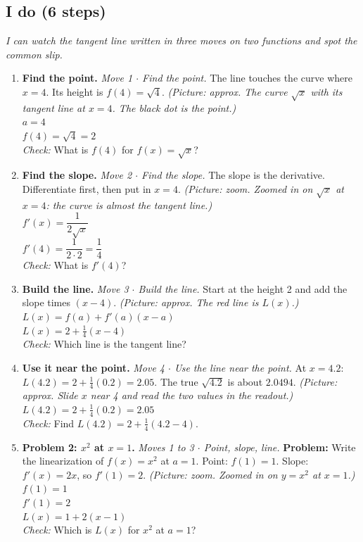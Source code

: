 \documentclass[11pt]{article}
\begin{document}
\subsection*{I do (6 steps)}
\textit{I can watch the tangent line written in three moves on two functions and spot the common slip.}\par
\begin{enumerate}
\item \textbf{Find the point.} \textit{Move 1 $\cdot$ Find the point.} The line touches the curve where $x=4$. Its height is $f(4)=\sqrt4$. \textit{(Picture: approx. The curve $\sqrt{x}$ with its tangent line at $x=4$. The black dot is the point.)}\\ $a=4$\\ $f(4)=\sqrt4=2$\\ \textit{Check:} What is $f(4)$ for $f(x)=\sqrt{x}$? 
\item \textbf{Find the slope.} \textit{Move 2 $\cdot$ Find the slope.} The slope is the derivative. Differentiate first, then put in $x=4$. \textit{(Picture: zoom. Zoomed in on $\sqrt{x}$ at $x=4$: the curve is almost the tangent line.)}\\ $f'(x)=\dfrac{1}{2\sqrt{x}}$\\ $f'(4)=\dfrac{1}{2\cdot2}=\dfrac14$\\ \textit{Check:} What is $f'(4)$? 
\item \textbf{Build the line.} \textit{Move 3 $\cdot$ Build the line.} Start at the height 2 and add the slope times $(x-4)$. \textit{(Picture: approx. The red line is $L(x)$.)}\\ $L(x)=f(a)+f'(a)(x-a)$\\ $L(x)=2+\tfrac14(x-4)$\\ \textit{Check:} Which line is the tangent line? 
\item \textbf{Use it near the point.} \textit{Move 4 $\cdot$ Use the line near the point.} At $x=4.2$: $L(4.2)=2+\tfrac14(0.2)=2.05$. The true $\sqrt{4.2}$ is about $2.0494$. \textit{(Picture: approx. Slide $x$ near 4 and read the two values in the readout.)}\\ $L(4.2)=2+\tfrac14(0.2)=2.05$\\ \textit{Check:} Find $L(4.2)=2+\tfrac14(4.2-4)$. 
\item \textbf{Problem 2: $x^2$ at $x=1$.} \textit{Moves 1 to 3 $\cdot$ Point, slope, line.} \textbf{Problem:} Write the linearization of $f(x)=x^2$ at $a=1$. Point: $f(1)=1$. Slope: $f'(x)=2x$, so $f'(1)=2$. \textit{(Picture: zoom. Zoomed in on $y=x^2$ at $x=1$.)}\\ $f(1)=1$\\ $f'(1)=2$\\ $L(x)=1+2(x-1)$\\ \textit{Check:} Which is $L(x)$ for $x^2$ at $a=1$? 

\end{enumerate}
\end{document}
